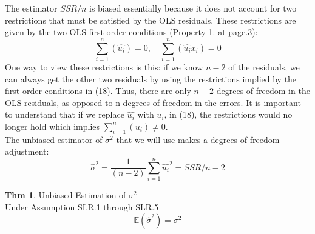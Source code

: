 \documentclass[a4paper, 10pt]{article}
\theoremstyle{definition}	%
\newtheorem{theorem}{Thm}
\begin{document}
The estimator $SSR/n$ is biased essentially because it does not account for two restrictions that must be satisfied by the OLS residuals. These restrictions are given by the two OLS first order conditions (Property 1. at page.3):
\begin{equation}
    \sum_{i=1}^{n} \left(\hat{u_i}\right) = 0, \quad \sum_{i=1}^{n} \left(\hat{u_i}x_i\right) = 0
\end{equation}
One way to view these restrictions is this: if we know $n - 2$ of the residuals, we can always get the other two residuals by using the restrictions implied by the first order conditions in (18). Thus, there are only $n - 2$ degrees of freedom in the OLS residuals, as opposed to n degrees of freedom in the errors. It is important to understand that if we replace $\hat{u_i}$ with $u_i$, in (18), the restrictions would no longer hold which implies $ \sum_{i=1}^{n}\left(u_i\right) \neq 0$.\\
The unbiased estimator of $\sigma^2$ that we will use makes a degrees of freedom adjustment:
\begin{equation}
    \hat{\sigma}^2 = \frac{1}{(n-2)}\sum_{i=1}^{n}\hat{u_i}^2 = SSR/n-2
\end{equation}
\begin{theorem}
    Unbiased Estimation of $\sigma^2$\\
    Under Assumption SLR.1 through SLR.5
    \begin{equation*}
        \mathbb{E}(\hat{\sigma}^2) = \sigma^2
    \end{equation*}
\end{theorem}
\end{document}
